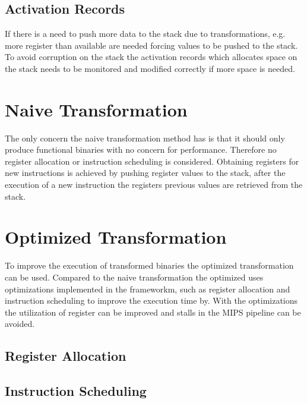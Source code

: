 \subsection{Activation Records}
If there is a need to push more data to the stack due to transformations, e.g. 
more register than available are needed forcing values to be pushed to the stack. 
To avoid corruption on the stack the activation records which allocates space
on the stack needs to be monitored and modified correctly if more space is needed.


\section{Naive Transformation}
The only concern the naive transformation method has is that it should only produce
functional binaries with no concern for performance. Therefore no register
allocation or instruction scheduling is considered. Obtaining registers
for new instructions is achieved by pushing register values to the stack, after
the execution of a new instruction the registers previous values are retrieved
from the stack. 

\section{Optimized Transformation}
To improve the execution of transformed binaries the optimized transformation
can be used. Compared to the naive transformation the optimized uses optimizations
implemented in the frameworkm, such as register allocation and instruction scheduling
to improve the execution time by. With the optimizations the utilization of register
can be improved and stalls in the MIPS pipeline can be avoided.


\subsection{Register Allocation}

\subsection{Instruction Scheduling}

